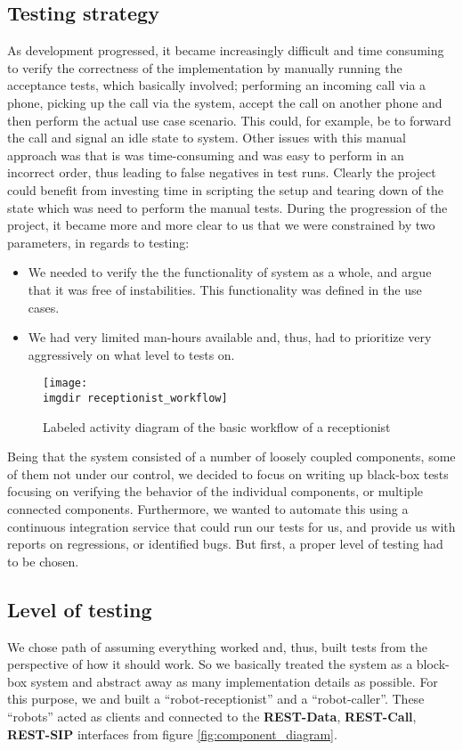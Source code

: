 \subsection{Testing strategy}
\label{sec:background-testing-strategy}
As development progressed, it became increasingly difficult and time consuming to verify the correctness of the implementation by manually running the acceptance tests, which basically involved; performing an incoming call via a phone, picking up the call via the system, accept the call on another phone and then perform the actual use case scenario. This could, for example, be to forward the call and signal an idle state to system. Other issues with this manual approach was that is was time-consuming and was easy to perform in an incorrect order, thus leading to false negatives in test runs. Clearly the project could benefit from investing time in scripting the setup and tearing down of the state which was need to perform the manual tests.
During the progression of the project, it became more and more clear to us that we were constrained by two parameters, in regards to testing:
\begin{itemize}
  \item We needed to verify the the functionality of system as a whole, and argue that it was free of instabilities. This functionality was defined in the use cases.
  \item We had very limited man-hours available and, thus, had to prioritize very aggressively on what level to tests on.
\end{itemize}
\begin{figure}[ht]
\centering
\texttt{[image: \\imgdir receptionist\_workflow]}
\caption{Labeled activity diagram of the basic workflow of a receptionist}
\label{fig:receptionist_workflow}
\end{figure}
Being that the system consisted of a number of loosely coupled components, some of them not under our control, we decided to focus on writing up black-box tests focusing on verifying the behavior of the individual components, or multiple connected components.
Furthermore, we wanted to automate this using a continuous integration service that could run our tests for us, and provide us with reports on regressions, or identified bugs. But first, a proper level of testing had to be chosen.

\subsection{Level of testing}
\label{ssec:level-of-testing}
We chose path of assuming everything worked and, thus,  built tests from the perspective of how it should work. So we basically treated the system as a block-box system and abstract away as many implementation details as possible. For this purpose, we and built a ``robot-receptionist'' and a ``robot-caller''. These ``robots'' acted as clients and connected to the \textbf{REST-Data}, \textbf{REST-Call}, \textbf{REST-SIP} interfaces from figure \ref{fig:component_diagram}.

